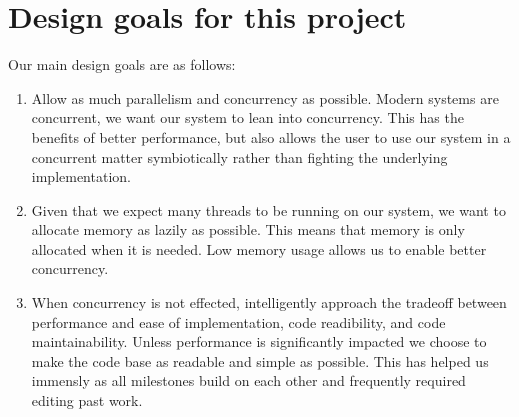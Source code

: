 \section{Design goals for this project}
\label{goals}
Our main design goals are as follows:
\begin{enumerate}
      \item Allow as much parallelism and concurrency as possible. Modern systems are concurrent,
      we want our system to lean into concurrency. This has the benefits of better performance,
      but also allows the user to use our system in a concurrent matter symbiotically rather than
      fighting the underlying implementation.
      \item Given that we expect many threads to be running on our system, we want to allocate memory
      as lazily as possible. This means that memory is only allocated when it is needed. Low memory usage
      allows us to enable better concurrency.
      \item When concurrency is not effected, intelligently approach the tradeoff between performance
      and ease of implementation, code readibility, and code maintainability. Unless performance is
      significantly impacted we choose to make the code base as readable and simple as possible. This has
      helped us immensly as all milestones build on each other and frequently required editing past work.
\end{enumerate}